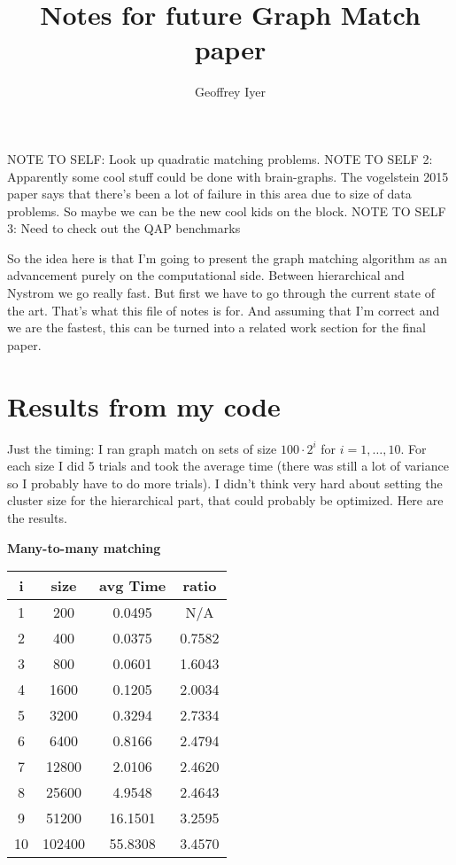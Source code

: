 \documentclass{article}[11pt]
\begin{document}
\title{Notes for future Graph Match paper} \author{Geoffrey Iyer}
\maketitle

NOTE TO SELF: Look up quadratic matching problems.
NOTE TO SELF 2: Apparently some cool stuff could be done with brain-graphs.
The vogelstein 2015 paper says that there's been a lot of failure in this area
due to size of data problems. So maybe we can be the new cool kids on the block.
NOTE TO SELF 3: Need to check out the QAP benchmarks

So the idea here is that I'm going to present the graph matching algorithm as an advancement purely on the computational side. Between hierarchical and Nystrom we go really fast. But first we have to go through the current state of the art. That's what this file of notes is for. And assuming that I'm correct and we are the fastest, this can be turned into a related work section for the final paper.

\section{Results from my code}

Just the timing: I ran graph match on sets of size $100\cdot2^i$ for $i = 1,\ldots,10$. For each size I did 5 trials and took the average time (there was still a lot of variance so I probably have to do more trials). I didn't think very hard about setting the cluster size for the hierarchical part, that could probably be optimized. Here are the results.

\textbf{Many-to-many matching} \\
\begin{tabular}{c|c|c|c|}
  i & size & avg Time & ratio \\
  \hline
  1 &    200 &  0.0495 &  N/A   \\ 
  2 &    400 &  0.0375 & 0.7582 \\
  3 &    800 &  0.0601 & 1.6043 \\
  4 &   1600 &  0.1205 & 2.0034 \\
  5 &   3200 &  0.3294 & 2.7334 \\
  6 &   6400 &  0.8166 & 2.4794 \\
  7 &  12800 &  2.0106 & 2.4620 \\
  8 &  25600 &  4.9548 & 2.4643 \\
  9 &  51200 & 16.1501 & 3.2595 \\
  10 & 102400 & 55.8308 & 3.4570 \\
\end{tabular}
\end{document}
